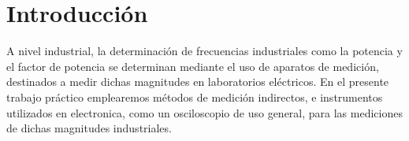 \section{Introducción}

   A nivel industrial, la determinación de frecuencias industriales como la potencia y el factor de potencia se 
   determinan mediante el uso de aparatos de medición, destinados a medir dichas magnitudes 
   en laboratorios eléctricos. En el presente trabajo práctico emplearemos métodos de medición 
   indirectos, e instrumentos utilizados en electronica, como un osciloscopio de uso general, 
   para las mediciones de dichas magnitudes industriales.   

